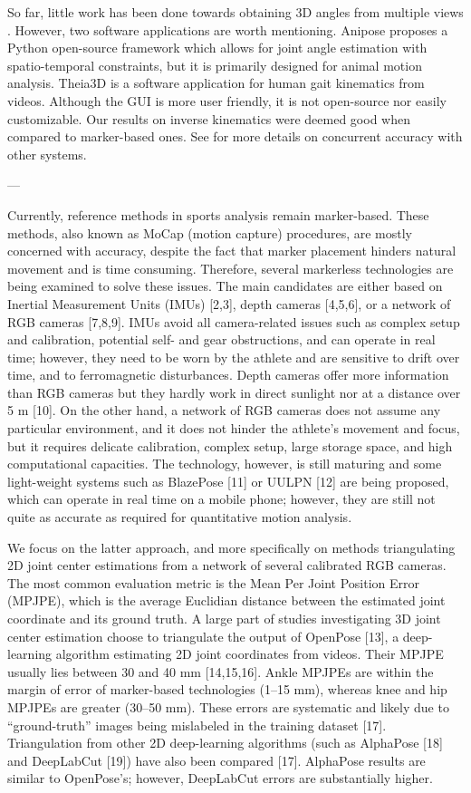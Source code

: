 So far, little work has been done towards obtaining 3D angles from multiple views \cite{Zheng2022}. However, two software applications are worth mentioning. Anipose \cite{Karashchuk2021} proposes a Python open-source framework which allows for joint angle estimation with spatio-temporal constraints, but it is primarily designed for animal motion analysis. Theia3D \cite{Kanko2021a} is a software application for human gait kinematics from videos. Although the GUI is more user friendly, it is not open-source nor easily customizable. Our results on inverse kinematics were deemed good when compared to marker-based ones. See \cite{Pagnon2022} for more details on concurrent accuracy with other systems.

---

Currently, reference methods in sports analysis remain marker-based. These methods, also known as MoCap (motion capture) procedures, are mostly concerned with accuracy, despite the fact that marker placement hinders natural movement and is time consuming. Therefore, several markerless technologies are being examined to solve these issues. The main candidates are either based on Inertial Measurement Units (IMUs) [2,3], depth cameras [4,5,6], or a network of RGB cameras [7,8,9]. IMUs avoid all camera-related issues such as complex setup and calibration, potential self- and gear obstructions, and can operate in real time; however, they need to be worn by the athlete and are sensitive to drift over time, and to ferromagnetic disturbances. Depth cameras offer more information than RGB cameras but they hardly work in direct sunlight nor at a distance over 5 m [10]. On the other hand, a network of RGB cameras does not assume any particular environment, and it does not hinder the athlete’s movement and focus, but it requires delicate calibration, complex setup, large storage space, and high computational capacities. The technology, however, is still maturing and some light-weight systems such as BlazePose [11] or UULPN [12] are being proposed, which can operate in real time on a mobile phone; however, they are still not quite as accurate as required for quantitative motion analysis.

We focus on the latter approach, and more specifically on methods triangulating 2D joint center estimations from a network of several calibrated RGB cameras. The most common evaluation metric is the Mean Per Joint Position Error (MPJPE), which is the average Euclidian distance between the estimated joint coordinate and its ground truth. A large part of studies investigating 3D joint center estimation choose to triangulate the output of OpenPose [13], a deep-learning algorithm estimating 2D joint coordinates from videos. Their MPJPE usually lies between 30 and 40 mm [14,15,16]. Ankle MPJPEs are within the margin of error of marker-based technologies (1–15 mm), whereas knee and hip MPJPEs are greater (30–50 mm). These errors are systematic and likely due to “ground-truth” images being mislabeled in the training dataset [17]. Triangulation from other 2D deep-learning algorithms (such as AlphaPose [18] and DeepLabCut [19]) have also been compared [17]. AlphaPose results are similar to OpenPose’s; however, DeepLabCut errors are substantially higher.

